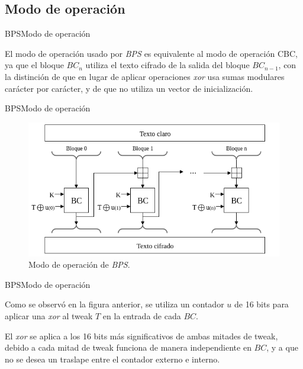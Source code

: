 %
%

\subsection{Modo de operación}

\begin{frame}{BPS}{Modo de operación}

  El modo de operación usado por \textit{BPS} es equivalente al modo de 
  operación CBC, ya que el bloque $BC_n$ utiliza el texto cifrado de la 
  salida del bloque $BC_{n-1}$, con la distinción de que en lugar de 
  aplicar operaciones \textit{xor} usa sumas modulares carácter por 
  carácter, y de que no utiliza un vector de inicialización.
  
\end{frame}

\begin{frame}{BPS}{Modo de operación}

  \begin{figure}[H]
    \begin{center}
      \includegraphics[width=1.00\linewidth]{diagramas/modo_de_operacion_bps}
      \caption{Modo de operación de \textit{BPS}.}
     \end{center}
  \end{figure}
  
\end{frame}

\begin{frame}{BPS}{Modo de operación}

  Como se observó en la figura anterior, se utiliza un contador $u$ de 16 
  bits para aplicar una \textit{xor} al tweak $T$ en la entrada de cada $BC$. 

  El \textit{xor} se aplica a los 16 bits más significativos de ambas mitades 
  de tweak, debido a cada mitad de tweak funciona de manera independiente en 
  $BC$, y a que no se desea un traslape entre el contador externo e interno.
  
\end{frame}

